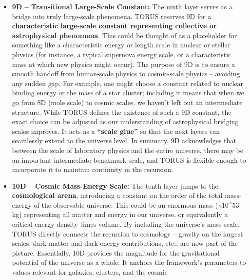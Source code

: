 \documentclass[
]{article}
\begin{document}
\begin{itemize}
{  of chemical and material quantities}, covering all constants that
  govern particle physics, gravity, and thermodynamics in everyday
  conditions. This completes what one might consider the ``laboratory
  scale'' physics within the recursion. Layers 0D--8D collectively have
  set up all the familiar constants of quantum mechanics, relativity,
  gravity, and thermodynamics.
\item
  \textbf{9D -- Transitional Large-Scale Constant:} The ninth layer
  serves as a bridge into truly large-scale phenomena. TORUS reserves 9D
  for a \textbf{characteristic large-scale constant representing
  collective or astrophysical phenomena}. This could be thought of as a
  placeholder for something like a characteristic energy or length scale
  in nuclear or stellar physics (for instance, a typical supernova
  energy scale, or a characteristic mass at which new physics might
  occur). The purpose of 9D is to ensure a smooth handoff from
  human-scale physics to cosmic-scale physics -- avoiding any sudden
  gap. For example, one might choose a constant related to nuclear
  binding energy or the mass of a star cluster; including it means that
  when we go from 8D (mole scale) to cosmic scales, we haven't left out
  an intermediate structure. While TORUS defines the existence of such a
  9D constant, the exact choice can be adjusted as our understanding of
  astrophysical bridging scales improves. It acts as a \textbf{``scale
  glue''} so that the next layers can seamlessly extend to the universe
  level. In summary, 9D acknowledges that between the scale of
  laboratory physics and the entire universe, there may be an important
  intermediate benchmark scale, and TORUS is flexible enough to
  incorporate it to maintain continuity in the recursion.
\item
  \textbf{10D -- Cosmic Mass-Energy Scale:} The tenth layer jumps to the
  \textbf{cosmological arena}, introducing a constant on the order of
  the total mass-energy of the observable universe. This could be an
  enormous mass (\textasciitilde10\^{}53 kg) representing all matter and
  energy in our universe, or equivalently a critical energy density
  times volume. By including the universe's mass scale, TORUS directly
  connects the recursion to cosmology -- gravity on the largest scales,
  dark matter and dark energy contributions, etc., are now part of the
  picture. Essentially, 10D provides the magnitude for the gravitational
  potential of the universe as a whole. It anchors the framework's
  parameters to values relevant for galaxies, clusters, and the cosmic

\end{itemize}
\end{document}
